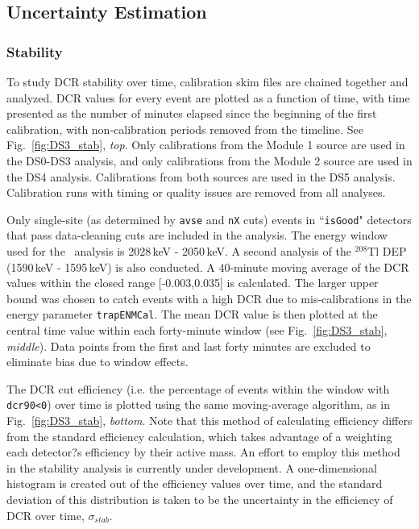 \subsection{Uncertainty Estimation}
\subsubsection{Stability}
To study DCR stability over time, calibration skim files are chained together and analyzed.  DCR values for every event are plotted as a function of time, with time presented as the number of minutes elapsed since the beginning of the first calibration, with non-calibration periods removed from the timeline. See Fig.~\ref{fig:DS3_stab}, {\it top}. Only calibrations from the Module 1 source are used in the DS0-DS3 analysis, and only calibrations from the Module 2 source are used in the DS4 analysis.  Calibrations from both sources are used in the DS5 analysis. Calibration runs with timing or quality issues are removed from all analyses.  

Only single-site (as determined by {\tt avse} and {\tt nX} cuts) events in ``{\tt isGood}" detectors that pass data-cleaning cuts are included in the analysis. The energy window used for the \nonubb\ analysis is 2028\,keV - 2050\,keV. A second analysis of the $^{208}$Tl DEP (1590\,keV - 1595\,keV) is also conducted. A 40-minute moving average of the DCR values within the closed range [-0.003,0.035] is calculated. The larger upper bound was chosen to catch events with a high DCR due to mis-calibrations in the energy parameter {\tt trapENMCal}. The mean DCR value is then plotted at the central time value within each forty-minute window (see Fig.~\ref{fig:DS3_stab}, {\it middle}). Data points from the first and last forty minutes are excluded to eliminate bias due to window effects. 

The DCR cut efficiency (i.e.  the percentage of events within the window with {\tt dcr90<0}) over time is plotted using the same moving-average algorithm, as in Fig.~\ref{fig:DS3_stab}, {\it bottom}. Note that this method of calculating efficiency differs from the standard efficiency calculation, which takes advantage of a weighting each detector?s efficiency by their active mass.  An effort to employ this method in the stability analysis is currently under development. A one-dimensional histogram is created out of the efficiency values over time, and the standard deviation of this distribution is taken to be the uncertainty in the efficiency of DCR over time, $\sigma_{stab}$. 

